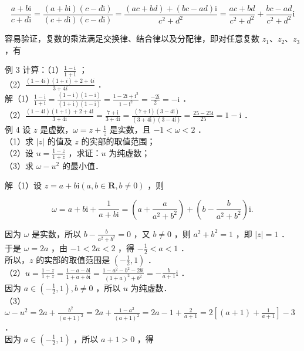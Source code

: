 \documentclass[10pt]{article}
\begin{document}
\[
\frac{a+b \mathrm{i}}{c+d \mathrm{i}}=\frac{(a+b \mathrm{i})(c-d \mathrm{i})}{(c+d \mathrm{i})(c-d \mathrm{i})}=\frac{(a c+b d)+(b c-a d) \mathrm{i}}{c^{2}+d^{2}}=\frac{a c+b d}{c^{2}+d^{2}}+\frac{b c-a d}{c^{2}+d^{2}} \mathrm{i}
\]

容易验证，复数的乘法满足交换律、结合律以及分配律，即对任意复数 \(z_{1} 、 z_{2} 、 z_{3}\) ，有

例 3 计算：（1）\(\frac{1-\mathrm{i}}{1+\mathrm{i}}\) ；\\
（2）\(\frac{(1-4 i)(1+i)+2+4 i}{3+4 i}\) ．\\
解（1）\(\frac{1-\mathrm{i}}{1+\mathrm{i}}=\frac{(1-\mathrm{i})(1-\mathrm{i})}{(1+\mathrm{i})(1-\mathrm{i})}=\frac{1-2 \mathrm{i}+\mathrm{i}^{2}}{1-\mathrm{i}^{2}}=\frac{-2 \mathrm{i}}{2}=-\mathrm{i}\) ．\\
（2）\(\frac{(1-4 \mathrm{i})(1+\mathrm{i})+2+4 \mathrm{i}}{3+4 \mathrm{i}}=\frac{7+\mathrm{i}}{3+4 \mathrm{i}}=\frac{(7+\mathrm{i})(3-4 \mathrm{i})}{(3+4 \mathrm{i})(3-4 \mathrm{i})}=\frac{25-25 \mathrm{i}}{25}=1-\mathrm{i}\) ．\\
例 4 设 \(z\) 是虚数，\(\omega=z+\frac{1}{z}\) 是实数，且 \(-1<\omega<2\) ．\\
（1）求 \(|z|\) 的值及 \(z\) 的实部的取值范围；\\
（2）设 \(u=\frac{1-z}{1+z}\) ，求证：\(u\) 为纯虚数；\\
（3）求 \(\omega-u^{2}\) 的最小值．

解（1）设 \(z=a+b \mathrm{i}(a, b \in \mathbf{R}, b \neq 0)\) ，则

\[
\omega=a+b \mathrm{i}+\frac{1}{a+b \mathrm{i}}=\left(a+\frac{a}{a^{2}+b^{2}}\right)+\left(b-\frac{b}{a^{2}+b^{2}}\right) \mathrm{i} .
\]

因为 \(\omega\) 是实数，所以 \(b-\frac{b}{a^{2}+b^{2}}=0\) ，又 \(b \neq 0\) ，则 \(a^{2}+b^{2}=1\) ，即 \(|z|=1\) ．\\
于是 \(\omega=2 a\) ，由 \(-1<2 a<2\) ，得 \(-\frac{1}{2}<a<1\) ．\\
所以，\(z\) 的实部的取值范围是 \(\left(-\frac{1}{2}, 1\right)\) ．\\
（2）\(u=\frac{1-z}{1+z}=\frac{1-a-b \mathrm{i}}{1+a+b \mathrm{i}}=\frac{1-a^{2}-b^{2}-2 b \mathrm{i}}{(1+a)^{2}+b^{2}}=-\frac{b}{a+1} \mathrm{i}\) ．\\
因为 \(a \in\left(-\frac{1}{2}, 1\right), b \neq 0\) ，所以 \(u\) 为纯虚数．\\
（3）\(\omega-u^{2}=2 a+\frac{b^{2}}{(a+1)^{2}}=2 a+\frac{1-a^{2}}{(a+1)^{2}}=2 a-1+\frac{2}{a+1}=2\left[(a+1)+\frac{1}{a+1}\right]-3\) ．\\
因为 \(a \in\left(-\frac{1}{2}, 1\right)\) ，所以 \(a+1>0\) ，得
\end{document}
